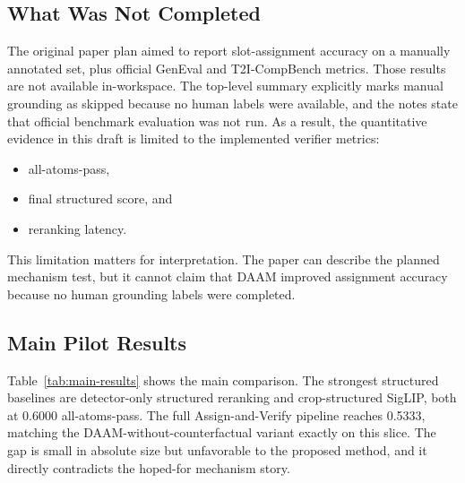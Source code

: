 \documentclass{article}
\newcommand{\method}{Assign-and-Verify\xspace}
\newcommand{\daam}{DAAM\xspace}
\begin{document}
\subsection{What Was Not Completed}

The original paper plan aimed to report slot-assignment accuracy on a manually annotated set, plus official GenEval and T2I-CompBench metrics. Those results are not available in-workspace. The top-level summary explicitly marks manual grounding as skipped because no human labels were available, and the notes state that official benchmark evaluation was not run. As a result, the quantitative evidence in this draft is limited to the implemented verifier metrics:
\begin{itemize}[leftmargin=*,topsep=2pt,itemsep=2pt]
  \item all-atoms-pass,
  \item final structured score, and
  \item reranking latency.
\end{itemize}

This limitation matters for interpretation. The paper can describe the planned mechanism test, but it cannot claim that \daam improved assignment accuracy because no human grounding labels were completed.

\subsection{Main Pilot Results}

Table~\ref{tab:main-results} shows the main comparison. The strongest structured baselines are detector-only structured reranking and crop-structured SigLIP, both at 0.6000 all-atoms-pass. The full \method pipeline reaches 0.5333, matching the \daam-without-counterfactual variant exactly on this slice. The gap is small in absolute size but unfavorable to the proposed method, and it directly contradicts the hoped-for mechanism story.
\end{document}
